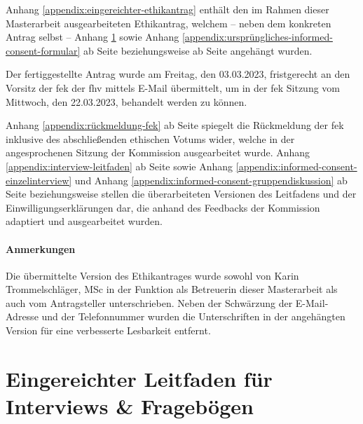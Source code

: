 \documentclass[a4paper,12pt,twoside]{scrreprt}
\begin{document}
Anhang \ref{appendix:eingereichter-ethikantrag} enthält den im Rahmen dieser Masterarbeit ausgearbeiteten Ethikantrag, welchem -- neben dem konkreten Antrag selbst -- Anhang \ref{appendix:ursprünglicher-leitfaden} sowie Anhang \ref{appendix:ursprüngliches-informed-consent-formular} ab Seite \pageref{appendix:ursprünglicher-leitfaden} beziehungsweise ab Seite \pageref{appendix:ursprüngliches-informed-consent-formular} angehängt wurden.

Der fertiggestellte Antrag wurde am Freitag, den 03.03.2023, fristgerecht an den Vorsitz der \acl{fek} der \acl{fhv} mittels E-Mail übermittelt, um in der \ac{fek} Sitzung vom Mittwoch, den 22.03.2023, behandelt werden zu können.

\medskip 

Anhang \ref{appendix:rückmeldung-fek} ab Seite \pageref{appendix:rückmeldung-fek} spiegelt die Rückmeldung der \ac{fek} inklusive des abschließenden ethischen Votums wider, welche in der angesprochenen Sitzung der Kommission ausgearbeitet wurde. Anhang \ref{appendix:interview-leitfaden} ab Seite \pageref{appendix:interview-leitfaden} sowie Anhang \ref{appendix:informed-consent-einzelinterview} und Anhang \ref{appendix:informed-consent-gruppendiskussion} ab Seite \pageref{appendix:informed-consent-einzelinterview} beziehungsweise \pageref{appendix:informed-consent-gruppendiskussion} stellen die überarbeiteten Versionen des Leitfadens und der Einwilligungserklärungen dar, die anhand des Feedbacks der Kommission adaptiert und ausgearbeitet wurden.

\subsubsection*{Anmerkungen}
\label{appendix:anmerkungen-eingereichter-ethikantrag}
Die übermittelte Version des Ethikantrages wurde sowohl von Karin Trommelschläger, MSc in der Funktion als Betreuerin dieser Masterarbeit als auch vom Antragsteller unterschrieben. Neben der Schwärzung der E-Mail-Adresse und der Telefonnummer wurden die Unterschriften in der angehängten Version für eine verbesserte Lesbarkeit entfernt.



\cleardoublepage
\chapter{Eingereichter Leitfaden für Interviews \& Fragebögen}
\label{appendix:ursprünglicher-leitfaden}
\end{document}
